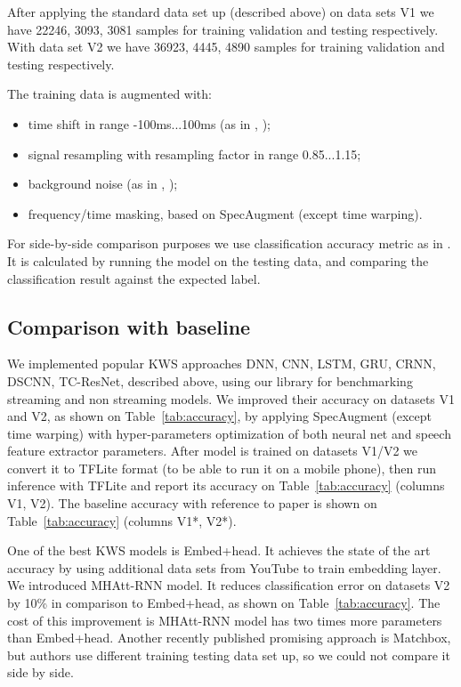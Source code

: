 \documentclass[a4paper]{article}
\begin{document}
After applying the standard data set up (described above) on data sets V1 \cite{DATA1} we have 22246, 3093, 3081 samples for training validation and testing respectively. With data set V2 \cite{DATA2} we have 36923, 4445, 4890 samples for training validation and testing respectively.

The training data is augmented with:
\begin{itemize}[noitemsep]
\item time shift in range -100ms...100ms (as in \cite{CODE1}, \cite{HELLO});
\item signal resampling with resampling factor in range 0.85...1.15;
\item background noise (as in \cite{CODE1}, \cite{HELLO});
\item frequency/time masking, based on SpecAugment \cite{SPEC} (except time warping).
\end{itemize}

For side-by-side comparison purposes we use classification accuracy metric as in \cite{HELLO}. It is calculated by running the model on the testing data, and comparing the classification result against the expected label.

\subsection{Comparison with baseline}

We implemented popular KWS approaches DNN\cite{HELLO}, CNN\cite{HELLO}, LSTM\cite{HELLO}, GRU\cite{HELLO}, CRNN\cite{HELLO}, DSCNN\cite{HELLO}, TC-ResNet\cite{TEMPCONV}, described above, using our library for benchmarking streaming and non streaming models. We improved their accuracy on datasets V1 and V2, as shown on Table~\ref{tab:accuracy}, by applying SpecAugment \cite{SPEC}(except time warping) with hyper-parameters optimization of both neural net and speech feature extractor parameters. After model is trained on datasets V1/V2 we convert it to TFLite format (to be able to run it on a mobile phone), then run inference with TFLite and report its accuracy on Table~\ref{tab:accuracy} (columns V1, V2). The baseline accuracy with reference to paper is shown on Table~\ref{tab:accuracy} (columns V1*, V2*).

One of the best KWS models is Embed+head\cite{LIMSDATA}. It achieves the state of the art accuracy by using additional data sets from YouTube to train embedding layer. We introduced MHAtt-RNN model. It reduces classification error on datasets V2 by 10\% in comparison to Embed+head\cite{LIMSDATA}, as shown on Table~\ref{tab:accuracy}. The cost of this improvement is MHAtt-RNN model has two times more parameters than Embed+head\cite{LIMSDATA}. Another recently published promising approach is Matchbox\cite{MATCHBOX}, but authors use different training testing data set up, so we could not compare it side by side.
\end{document}

